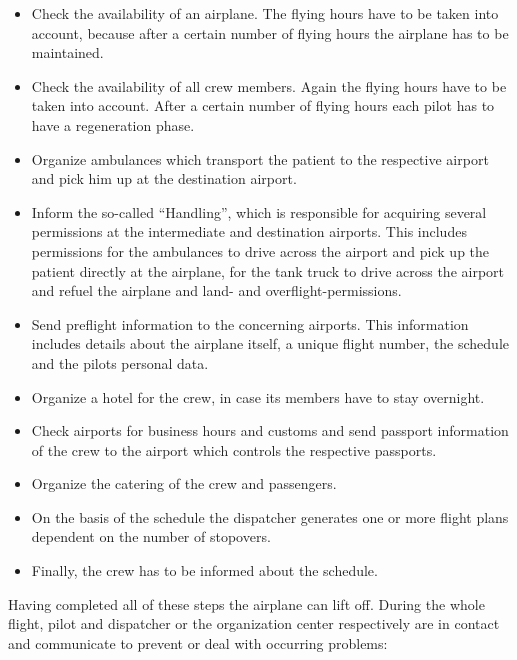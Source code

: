 \begin{itemize}
  \item Check the availability of an airplane. The flying hours have to be taken into account,
  because after a certain number of flying hours the airplane has to be maintained.
  \item Check the availability of all crew members. Again the flying hours have to be taken into
  account. After a certain number of flying hours each pilot has to have a regeneration phase.
  \item Organize ambulances which transport the patient to the respective airport and pick him up
  at the destination airport.
  \item Inform the so-called ``Handling'', which is responsible for acquiring several permissions at
  the intermediate and destination airports. This includes permissions for the ambulances to drive
  across the airport and pick up the patient directly at the airplane, for the tank truck to drive
  across the airport and refuel the airplane and land- and overflight-permissions.
  \item Send preflight information to the concerning airports. This information includes details
  about the airplane itself, a unique flight number, the schedule and the pilots personal data.
  \item Organize a hotel for the crew, in case its members have to stay overnight.
  \item Check airports for business hours and customs and send passport information of the crew to
  the airport which controls the respective passports.
  \item Organize the catering of the crew and passengers.
  \item On the basis of the schedule the dispatcher generates one or more flight plans
  dependent on the number of stopovers.
  \item Finally, the crew has to be informed about the schedule.
\end{itemize}

Having completed all of these steps the airplane can lift off. During the whole flight, pilot and
dispatcher or the organization center respectively are in contact and communicate to prevent or
deal with occurring problems:

